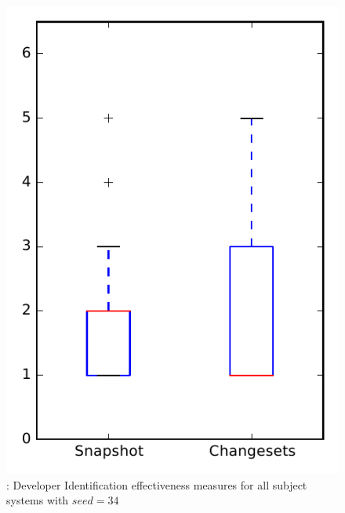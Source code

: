 
\begin{figure}
\centering
\includegraphics[height=0.4\textheight]{figures/dit_seed/rq1_overview_34}
\caption{\rtwo: Developer Identification effectiveness measures for all subject systems with $seed=34$}
\label{fig:dit_seed:rq1:overview}
\end{figure}
